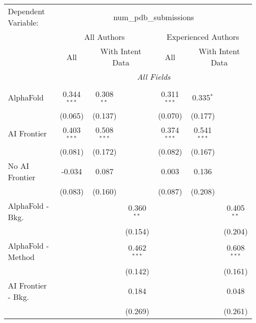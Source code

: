 \begingroup
\centering
\begin{tabular}{lcccccc}
   \tabularnewline \midrule \midrule
   Dependent Variable: & \multicolumn{6}{c}{num\_pdb\_submissions}\\
 & \multicolumn{3}{c}{All Authors} & \multicolumn{3}{c}{Experienced Authors} \\
\cmidrule(lr){2-4} \cmidrule(lr){5-7}
 & \multicolumn{1}{c}{All} & \multicolumn{2}{c}{With Intent Data} & \multicolumn{1}{c}{All} & \multicolumn{2}{c}{With Intent Data} \\
\cmidrule(lr){2-2} \cmidrule(lr){3-4} \cmidrule(lr){5-5} \cmidrule(lr){6-7}
 & \multicolumn{6}{c}{\textit{All Fields}} \\ \\
   AlphaFold               & 0.344$^{***}$ & 0.308$^{**}$  &               & 0.311$^{***}$ & 0.335$^{*}$   &   \\   
                           & (0.065)       & (0.137)       &               & (0.070)       & (0.177)       &   \\   
   AI Frontier             & 0.403$^{***}$ & 0.508$^{***}$ &               & 0.374$^{***}$ & 0.541$^{***}$ &   \\   
                           & (0.081)       & (0.172)       &               & (0.082)       & (0.167)       &   \\   
   No AI Frontier          & -0.034        & 0.087         &               & 0.003         & 0.136         &   \\   
                           & (0.083)       & (0.160)       &               & (0.087)       & (0.208)       &   \\   
   AlphaFold - Bkg.        &               &               & 0.360$^{**}$  &               &               & 0.405$^{**}$\\   
                           &               &               & (0.154)       &               &               & (0.204)\\   
   AlphaFold - Method      &               &               & 0.462$^{***}$ &               &               & 0.608$^{***}$\\   
                           &               &               & (0.142)       &               &               & (0.161)\\   
   AI Frontier - Bkg.      &               &               & 0.184         &               &               & 0.048\\   
                           &               &               & (0.269)       &               &               & (0.261)\\   

\end{tabular}
